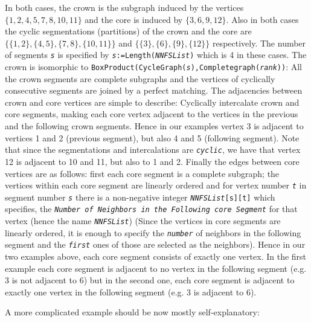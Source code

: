\documentclass[a4paper,11pt]{report}
\begin{document}
{{{In both cases, the crown is the subgraph induced by the vertices $\{1,2,4,5,7,8,10,11\}$ and the core is induced by $\{3,6,9,12\}$. Also in both cases the cyclic segmentations (partitions) of the crown and
the core are $\{\{1,2\},\{4,5\},\{7,8\},\{10,11\}\}$ and $\{\{3\},\{6\},\{9\},\{12\}\}$ respectively. The number of segments \mbox{\texttt{\mdseries\slshape s}} is specified by \texttt{\mbox{\texttt{\mdseries\slshape s}}:=Length(\mbox{\texttt{\mdseries\slshape NNFSList}})} which is 4 in these cases. The crown is isomorphic to \texttt{BoxProduct(CycleGraph(\mbox{\texttt{\mdseries\slshape s}}),Completegraph(\mbox{\texttt{\mdseries\slshape rank}}))}: All the crown segments are complete subgraphs and the vertices of cyclically
consecutive segments are joined by a perfect matching. The adjacencies between
crown and core vertices are simple to describe: Cyclically intercalate crown
and core segments, making each core vertex adjacent to the vertices in the
previous and the following crown segments. Hence in our examples vertex 3 is
adjacent to vertices 1 and 2 (previous segment), but also 4 and 5 (following
segment). Note that since the segmentations and intercalations are \mbox{\texttt{\mdseries\slshape cyclic}}, we have that vertex 12 is adjacent to 10 and 11, but also to 1 and 2.
Finally the edges between core vertices are as follows: first each core
segment is a complete subgraph; the vertices within each core segment are
linearly ordered and for vertex number \mbox{\texttt{\mdseries\slshape t}} in segment number \mbox{\texttt{\mdseries\slshape s}} there is a non-negative integer \texttt{\mbox{\texttt{\mdseries\slshape NNFSList}}[s][t]} which specifies, the \mbox{\texttt{\mdseries\slshape Number of Neighbors in the Following core Segment}} for that vertex (hence the name \mbox{\texttt{\mdseries\slshape NNFSList}}) (Since the vertices in core segments are linearly ordered, it is enough to
specify the \mbox{\texttt{\mdseries\slshape number}} of neighbors in the following segment and the \mbox{\texttt{\mdseries\slshape first}} ones of those are selected as the neighbors). Hence in our two examples above,
each core segment consists of exactly one vertex. In the first example each
core segment is adjacent to no vertex in the following segment (e.g. 3 is not
adjacent to 6) but in the second one, each core segment is adjacent to exactly
one vertex in the following segment (e.g. 3 is adjacent to 6). 

A more complicated example should be now mostly self-explanatory: 

}}}
\end{document}
